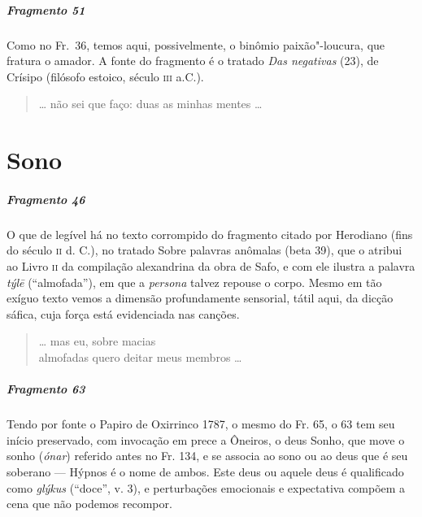 {\paragraph{Fragmento 51}

{\small Como no Fr.~36, temos aqui, possivelmente, o binômio paixão"-loucura, que fratura o amador. A
fonte do fragmento é o tratado \textit{Das negativas} (23), de Crísipo (filósofo
estoico, século \textsc{iii} a.C.).}   %

\begin{verse}
\ldots{} não sei que faço: duas as minhas mentes \ldots{}
\end{verse}

\chapter{Sono}

\paragraph{Fragmento 46}

{\small O que de legível há no texto corrompido do fragmento citado por Herodiano (fins do século \textsc{ii} d. C.), no tratado Sobre palavras anômalas (beta 39), que o atribui ao Livro \textsc{ii} da compilação alexandrina da obra de Safo, e com ele ilustra a palavra \textit{týlē} (``almofada''), em que a \textit{persona} talvez repouse o corpo. Mesmo em tão exíguo texto vemos a dimensão profundamente sensorial, tátil aqui, da dicção sáfica, cuja força está evidenciada nas canções.}

\begin{verse}
\ldots{} mas eu, sobre macias\\
almofadas quero deitar meus membros \ldots{}
\end{verse}


\paragraph{Fragmento 63}

{\small Tendo por fonte o Papiro de Oxirrinco 1787, o mesmo do Fr. 65, o 63 tem seu início preservado, com invocação em prece a Ôneiros, o deus Sonho, que move o sonho (\textit{ónar}) referido antes no Fr. 134, e se associa ao sono ou ao deus que é seu soberano --- Hýpnos é o nome de ambos. Este deus ou aquele deus é qualificado como \textit{glýkus} (``doce'', v. 3), e perturbações emocionais e expectativa compõem a cena que não podemos recompor.}

}
